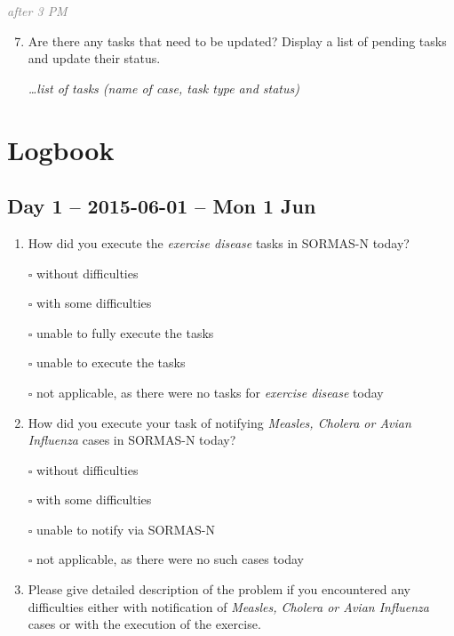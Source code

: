\documentclass[a4paper, titlepage]{tufte-handout}
\begin{document}
\emph{\textcolor{gray}{after 3 PM}}

\begin{enumerate}
\setcounter{enumi}{6}
\item Are there any tasks that need to be updated? Display a list of pending tasks and update their status.

\emph{\ldots list of tasks (name of case, task type and status)}
\end{enumerate}
\section{Logbook}
\label{sec-8}


\subsection{Day 1 -- 2015-06-01 -- Mon  1 Jun}
\label{sec-8-1}
\begin{enumerate}
\item How did you execute the \emph{exercise disease} tasks in SORMAS-N today?

\quad $\square$ without difficulties

\quad $\square$ with some difficulties

\quad $\square$ unable to fully execute the tasks

\quad $\square$ unable to execute the tasks

\quad $\square$ not applicable, as there were no tasks for \emph{exercise disease} today

\item How did you execute your task of notifying \emph{Measles, Cholera or Avian Influenza} cases in SORMAS-N today?

\quad $\square$ without difficulties

\quad $\square$ with some difficulties

\quad $\square$ unable to notify via SORMAS-N

\quad $\square$ not applicable, as there were no such cases today

\item Please give detailed description of the problem if you encountered any difficulties either with notification of \emph{Measles, Cholera or Avian Influenza} cases or with the execution of the exercise.

\hrulefill

\hrulefill

\hrulefill

\hrulefill

\hrulefill

\hrulefill

\hrulefill

\hrulefill

\hrulefill

\hrulefill
\end{enumerate}
\end{document}
